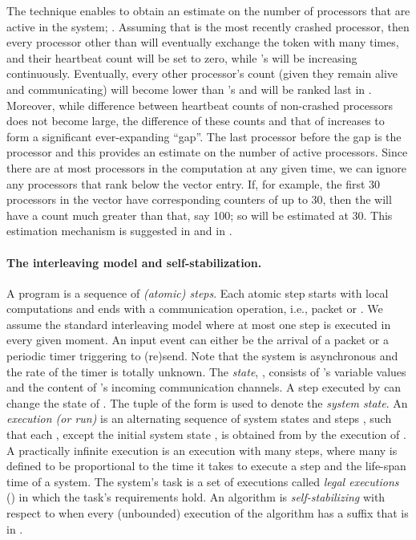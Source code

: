 \documentclass[11pt]{article}
\begin{document}
The technique enables  to obtain an estimate on the number of processors  that are active in the system; . Assuming that  is the most recently crashed processor, then every processor other than  will eventually exchange the token with  many times, and their heartbeat count will be set to zero, while 's will be increasing continuously.
Eventually, every other processor's count (given they remain alive and communicating) will become lower than 's and  will be ranked last in .
Moreover, while difference between heartbeat counts of non-crashed processors does not become large, the difference of these counts and that of  increases to form a significant ever-expanding ``gap''.
The last processor before the gap is the  processor and this provides an estimate on the number of active processors.
Since there are at most  processors in the computation at any given time, we can ignore any processors that rank below the  vector entry.
If, for example, the first 30 processors in the vector have corresponding counters of up to 30, then the  will have a count much greater than that, say 100; so  will be estimated at 30.
This estimation mechanism is suggested in \cite{DBLP:journals/cjtcs/DolevH97} and in \cite{DBLP:journals/tmc/DolevSW06}. \\








\paragraph{The interleaving model and self-stabilization.}
A program is a sequence of {\em (atomic) steps}. Each atomic step starts with local computations and ends with a communication operation, i.e., packet  or . We assume the standard interleaving model where at most one step is executed in every given moment.  An input event can either be the arrival of a  packet or a periodic timer triggering  to (re)send. Note that the system is asynchronous and the rate of the timer is totally unknown. The {\em state}, , consists of 's variable values and the content of 's incoming communication channels. A step executed by  can change the state of . The tuple of the form  is used to denote the {\em system state}. An {\em execution (or run)}  is an alternating sequence of system states  and steps , such that each , except the initial system state , is obtained from  by the execution of . A practically infinite execution is an execution with many steps, where many is defined to be proportional to the time it takes to execute a step and the life-span time of a system. The system's task is a set of executions called {\em legal executions} () in which the task's requirements hold. An algorithm is {\em self-stabilizing} with respect to  when every (unbounded) execution of the algorithm has a suffix that is in .
\end{document}
